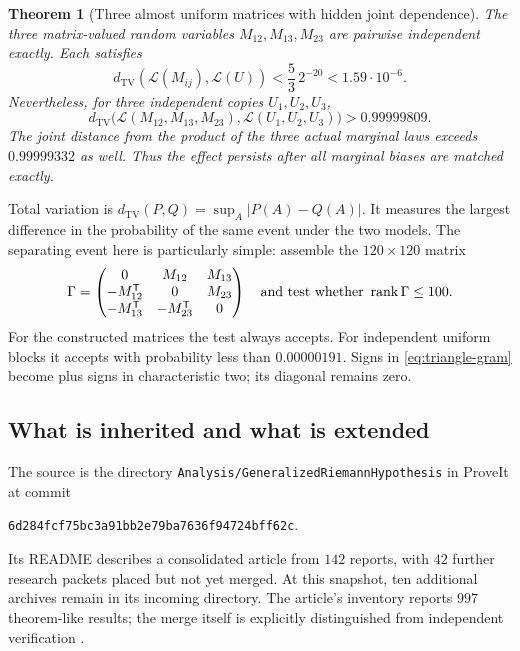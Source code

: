 \documentclass[11pt,letterpaper]{article}
\newtheorem{theorem}{Theorem}[section]
\theoremstyle{definition}
\theoremstyle{remark}
\newcommand{\TV}{d_{\mathrm{TV}}}
\newcommand{\Law}{\mathcal L}
\newcommand{\rank}{\operatorname{rank}}
\newcommand{\abs}[1]{\lvert #1\rvert}
\newcommand{\pin}{6d284fcf75bc3a91bb2e79ba7636f94724bff62c}
\begin{document}
\begin{theorem}[Three almost uniform matrices with hidden joint dependence]\label{thm:headline}
The three matrix-valued random variables $M_{12},M_{13},M_{23}$ are pairwise independent exactly. Each satisfies
\begin{equation}\label{eq:headline-one}
 \TV(\Law(M_{ij}),\Law(U))
 <\frac{5}{3}\,2^{-20}<1.59\cdot10^{-6}.
\end{equation}
Nevertheless, for three independent copies $U_1,U_2,U_3$,
\begin{equation}\label{eq:headline-all}
 \TV\bigl(\Law(M_{12},M_{13},M_{23}),\Law(U_1,U_2,U_3)\bigr)
 >0.99999809.
\end{equation}
The joint distance from the product of the three actual marginal laws exceeds $0.99999332$ as well. Thus the effect persists after all marginal biases are matched exactly.
\end{theorem}

Total variation is $\TV(P,Q)=\sup_A\abs{P(A)-Q(A)}$. It measures the largest difference in the probability of the same event under the two models. The separating event here is particularly simple: assemble the $120\times120$ matrix
\begin{equation}\label{eq:triangle-gram}
 \Gamma=\begin{pmatrix}
 0&M_{12}&M_{13}\\
 -M_{12}^{\mathsf T}&0&M_{23}\\
 -M_{13}^{\mathsf T}&-M_{23}^{\mathsf T}&0
 \end{pmatrix}
 \quad\hbox{and test whether }\rank\Gamma\le100.
\end{equation}
For the constructed matrices the test always accepts. For independent uniform blocks it accepts with probability less than $0.00000191$. Signs in \eqref{eq:triangle-gram} become plus signs in characteristic two; its diagonal remains zero.

\subsection{What is inherited and what is extended}

The source is the directory \texttt{Analysis/GeneralizedRiemannHypothesis} in ProveIt at commit
\begin{center}\small\texttt{\pin}.\end{center}
Its README describes a consolidated article from $142$ reports, with $42$ further research packets placed but not yet merged. At this snapshot, ten additional archives remain in its incoming directory. The article's inventory reports $997$ theorem-like results; the merge itself is explicitly distinguished from independent verification \cite{ProveIt}.
\end{document}
